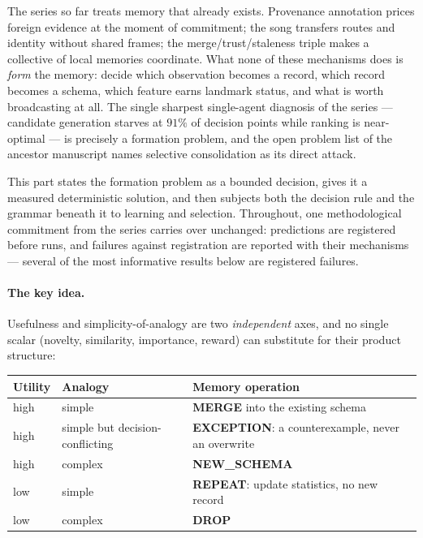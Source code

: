 \documentclass{article}
\begin{document}
The series so far treats memory that already exists. Provenance
annotation prices foreign evidence at the moment of commitment; the
song transfers routes and identity without shared frames; the
merge/trust/staleness triple makes a collective of local memories
coordinate. What none of these mechanisms does is \emph{form} the
memory: decide which observation becomes a record, which record
becomes a schema, which feature earns landmark status, and what is
worth broadcasting at all. The single sharpest single-agent diagnosis
of the series --- candidate generation starves at $91\%$ of decision
points while ranking is near-optimal --- is precisely a formation
problem, and the open problem list of the ancestor manuscript names
selective consolidation as its direct attack.

This part states the formation problem as a bounded decision, gives
it a measured deterministic solution, and then subjects both the
decision rule and the grammar beneath it to learning and selection.
Throughout, one methodological commitment from the series carries
over unchanged: predictions are registered before runs, and failures
against registration are reported with their mechanisms --- several
of the most informative results below are registered failures.

\paragraph{The key idea.} Usefulness and simplicity-of-analogy are
two \emph{independent} axes, and no single scalar (novelty,
similarity, importance, reward) can substitute for their product
structure:

\begin{center}
\small
\begin{tabular}{lll}
\toprule
Utility & Analogy & Memory operation \\
\midrule
high & simple & \textbf{MERGE} into the existing schema \\
high & simple but decision-conflicting & \textbf{EXCEPTION}: a
counterexample, never an overwrite \\
high & complex & \textbf{NEW\_SCHEMA} \\
low & simple & \textbf{REPEAT}: update statistics, no new record \\
low & complex & \textbf{DROP} \\
\bottomrule
\end{tabular}
\end{center}
\end{document}
